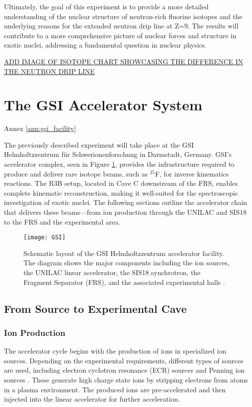 Ultimately, the goal of this experiment is to provide a more detailed understanding of the nuclear structure of neutron-rich fluorine isotopes and the underlying reasons for the extended neutron drip line at Z=9. The results will contribute to a more comprehensive picture of nuclear forces and structure in exotic nuclei, addressing a fundamental question in nuclear physics.


\underline{ADD IMAGE OF ISOTOPE CHART SHOWCASING THE DIFFERENCE IN THE NEUTRON DRIP LINE}


\section{The GSI Accelerator System}
Annex \ref{ann:gsi_facility}

The previously described experiment will take place at the GSI Helmholtzzentrum für Schwerionenforschung in Darmstadt, Germany. GSI’s accelerator complex, seen in Figure \ref{fig:GSI}, provides the infrastructure required to produce and deliver rare isotope beams, such as $^{25}$F, for inverse kinematics reactions. The \gls{R3B} setup, located in Cave C downstream of the FRS, enables complete kinematic reconstruction, making it well-suited for the spectroscopic investigation of exotic nuclei. The following sections outline the accelerator chain that delivers these beams—from ion production through the UNILAC and SIS18 to the FRS and the experimental area.

\begin{figure}
	\texttt{[image: GSI]}
	\caption{Schematic layout of the GSI Helmholtzzentrum accelerator facility. The diagram shows the major components including the ion sources, the UNILAC linear accelerator, the SIS18 synchrotron, the Fragment Separator (FRS), and the associated experimental halls \cite{gsiAcceleratorFacility}.}
	\label{fig:GSI}
\end{figure}


\subsection{From Source to Experimental Cave}

\subsubsection{Ion Production}

The accelerator cycle begins with the production of ions in specialized ion sources. Depending on the experimental requirements, different types of sources are used, including electron cyclotron resonance (ECR) sources and Penning ion sources \cite{hollinger_status_2008}. These generate high charge state ions by stripping electrons from atoms in a plasma environment. The produced ions are pre-accelerated and then injected into the linear accelerator for further acceleration.


